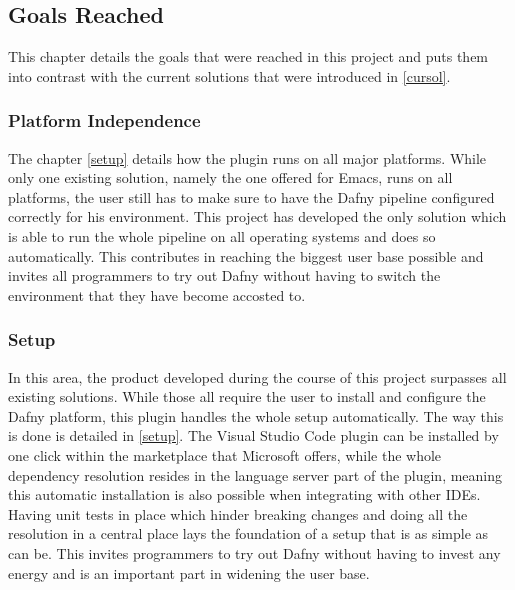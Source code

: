 \subsection{Goals Reached}\label{golrech}
This chapter details the goals that were reached in this project and puts them into contrast with the current solutions that were introduced in \ref{cursol}.

\subsubsection{Platform Independence}
The chapter \ref{setup} details how the plugin runs on all major platforms. While only one existing solution, namely the one offered for Emacs, runs on all platforms, the user still has to make sure to have the Dafny pipeline configured correctly for his environment. \newline
This project has developed the only solution which is able to run the whole pipeline on all operating systems and does so automatically. This contributes in reaching the biggest user base possible and invites all programmers to try out Dafny without having to switch the environment that they have become accosted to.  

\subsubsection{Setup}
In this area, the product developed during the course of this project surpasses all existing solutions. While those all require the user to install and configure the Dafny platform, this plugin handles the whole setup automatically. The way this is done is detailed in \ref{setup}. The Visual Studio Code plugin can be installed by one click within the marketplace that Microsoft offers, while the whole dependency resolution resides in the language server part of the plugin, meaning this automatic installation is also possible when integrating with other IDEs. \newline
Having unit tests in place which hinder breaking changes and doing all the resolution in a central place lays the foundation of a setup that is as simple as can be. This invites programmers to try out Dafny without having to invest any energy and is an important part in widening the user base. 

